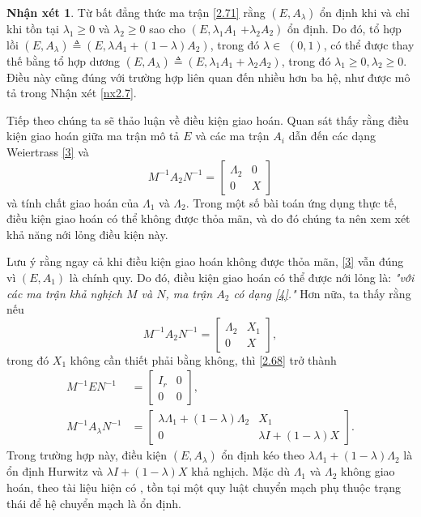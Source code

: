 \documentclass[12pt,a4paper]{report}
\theoremstyle{definition}
\newtheorem{nx}{Nhận xét}
\theoremstyle{definition}
\numberwithin{dl}{chapter}
\numberwithin{vd}{chapter}
\numberwithin{corollary}{chapter}
\numberwithin{lemma}{chapter}
\numberwithin{md}{chapter}
\numberwithin{dn}{chapter}
\numberwithin{cy}{chapter}
\numberwithin{nx}{chapter}
\begin{document}
\begin{nx} Từ bất đẳng thức ma trận \eqref{2.71} rằng $\left(E, A_{\lambda}\right)$ ổn định khi và chỉ khi tồn tại $\lambda_{1} \geq 0$ và $\lambda_{2} \geq 0$ sao cho $\left(E, \lambda_{1} A_{1}\right.$ $\left.+\lambda_{2} A_{2}\right)$ ổn định. Do đó, tổ hợp lồi $\left(E, A_{\lambda}\right) \triangleq\left(E, \lambda A_{1}+(1-\lambda) A_{2}\right)$, trong đó $\lambda \in$ $(0,1)$, có thể được thay thế bằng tổ hợp dương $\left(E, A_{\lambda}\right) \triangleq\left(E, \lambda_{1} A_{1}+\lambda_{2} A_{2}\right)$, trong đó $\lambda_{1} \geq 0, \lambda_{2} \geq 0$. Điều này cũng đúng với trường hợp liên quan đến nhiều hơn ba hệ, như được mô tả trong Nhận xét \ref{nx2.7}. 
\end{nx}
Tiếp theo chúng ta sẽ thảo luận về điều kiện giao hoán. Quan sát thấy rằng điều kiện giao hoán giữa ma trận mô tả $E$ và các ma trận $A_{i}$  dẫn đến các dạng Weiertrass \eqref{3} và 
\begin{equation} \label{4}
 M^{-1} A_{2} N^{-1}=\left[\begin{array}{cc}\Lambda_{2} & 0 \\ 0 & X\end{array}\right]   
\end{equation}
và tính chất giao hoán của $\Lambda_{1}$ và $\Lambda_{2}$. Trong một số bài toán ứng dụng thực tế, điều kiện giao hoán có thể không được thỏa mãn, và do đó chúng ta nên xem xét khả năng nới lỏng điều kiện này.

Lưu ý rằng ngay cả khi điều kiện giao hoán không được thỏa mãn, \eqref{3} vẫn đúng vì $\left(E, A_{1}\right)$ là chính quy. Do đó, điều kiện giao hoán có thể được nới lỏng là: \emph{"với các ma trận khả nghịch $M$ và $N$, ma trận $A_{2}$ có dạng \eqref{4}."} Hơn nữa, ta thấy rằng  nếu
\begin{equation} \label{5}
   M^{-1} A_{2} N^{-1}=\left[\begin{array}{cc}
\Lambda_{2} & X_{1} \\
0 & X
\end{array}\right], 
\end{equation} 
trong đó $X_{1}$ không cần thiết phải bằng không, thì \eqref{2.68} trở thành 
$$
\begin{aligned}
M^{-1} E N^{-1} &=\left[\begin{array}{cc}
I_{r} & 0 \\
0 & 0
\end{array}\right], \\
M^{-1} A_{\lambda} N^{-1} &=\left[\begin{array}{cc}
\lambda \Lambda_{1}+(1-\lambda) \Lambda_{2} & X_{1} \\
0 & \lambda I+(1-\lambda) X
\end{array}\right].
\end{aligned} 
$$
Trong trường hợp này, điều kiện $\left(E, A_{\lambda}\right)$ ổn định kéo theo $\lambda \Lambda_{1}+(1-\lambda) \Lambda_{2}$ là ổn định Hurwitz và  $\lambda I+(1-\lambda) X$ khả nghịch. Mặc dù  $\Lambda_{1}$ và $\Lambda_{2}$ không giao hoán, theo tài liệu hiện có \cite{M98}, tồn tại một quy luật chuyển mạch phụ thuộc trạng thái để hệ chuyển mạch là ổn định.
\end{document}

